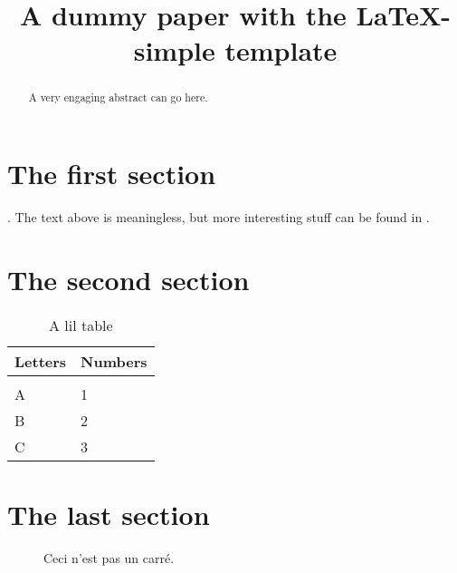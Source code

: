 \documentclass[11pt]{article}
\title{A dummy paper with the LaTeX-simple template}
\author[1]{\nameemail{Ada Lovelace}{ada@lovelace.com}}
\author[2,3]{\nameemail{Maria Mitchell}{maria@mitchell.com}}
\author[4]{\nameemail{Katherine Johnson}{katherine@johnson.com}}
\affil[1]{Ada's Institution}
\affil[2]{Maria's Institution 1}
\affil[3]{Maria's Institution 2}
\affil[4]{Katherine's Institution}
\begin{document}
\maketitle

\begin{abstract}
  A very engaging abstract can go here.
\end{abstract}

\section{The first section}

\blindtext. The text above is meaningless, but more interesting stuff can be found in \citet{mitchell2003venus}.

\section{The second section}

\blindtext[2]

\blinditemize

\blindtext

\begin{table}[h]
\label{tab:thetable}
\caption{A lil table}
\begin{center}
\begin{tabular}{ll}
Letters & Numbers \\
\hline            \\
A       & 1       \\
B       & 2       \\
C       & 3       \\
\end{tabular}
\end{center}
\end{table}

\section{The last section}

\blindmathfalse

\begin{figure}[t]
\label{fig:thefigure}
\begin{center}
\fbox{\rule[-.5cm]{0cm}{4cm} \rule[-.5cm]{4cm}{0cm}}
\end{center}
\caption{Ceci n'est pas un carré.}
\end{figure}

\blindtext[2]
\end{document}
